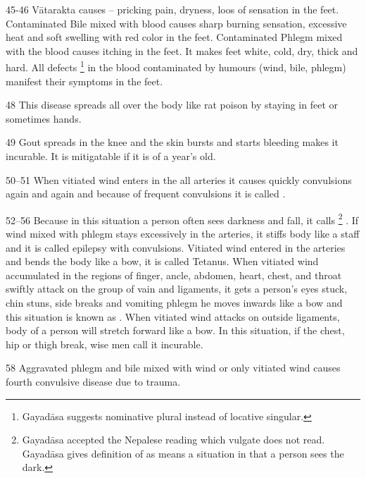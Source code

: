 \begin{translation}
\item[45-46] Vātarakta causes -- pricking pain, dryness, loos of sensation in the feet. Contaminated Bile mixed with blood causes sharp burning sensation, excessive heat and soft swelling with red color in the feet. Contaminated Phlegm mixed with the blood causes itching in the feet. It makes feet white, cold, dry, thick and hard. All defects \footnote{Gayadāsa suggests  nominative plural instead of locative singular.} in the blood contaminated by humours (wind, bile, phlegm) manifest their symptoms in the feet.

\item[48] This disease spreads all over the body like rat poison by staying in feet or sometimes hands.

\item[49] Gout spreads in the knee and the skin bursts and starts bleeding makes it incurable. It is mitigatable if it is of a year’s old.

\item[50--51] When vitiated wind enters in the all arteries it causes quickly 
convulsions again and again and because of frequent convulsions  it is 
called .


\item[52--56] Because in this situation a person often sees darkness and fall, it calls  \footnote{Gayadāsa accepted the Nepalese reading  which vulgate does not read. Gayadāsa gives definition of  as  means a situation in that a person sees the dark.} . If wind mixed with phlegm stays excessively in the arteries, it stiffs body like a staff and it is called  epilepsy with convulsions. Vitiated wind entered in the arteries and bends the body like a bow, it is called  Tetanus. 
When vitiated wind accumulated in the regions of finger, ancle, abdomen, heart, chest, and throat swiftly attack on the group of vain and ligaments, it gets a person’s eyes stuck, chin stuns, side breaks and vomiting phlegm he moves inwards like a bow and this situation is known as . When vitiated wind attacks on outside ligaments, body of a person will stretch forward like a bow. In this situation, if the chest, hip or thigh break, wise men call it incurable.




\item[58] Aggravated phlegm and bile mixed with wind or only vitiated wind causes fourth convulsive disease due to trauma.


\end{translation}
